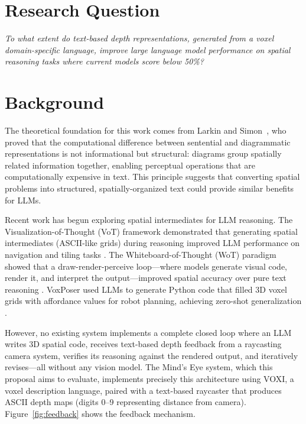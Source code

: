 \documentclass[stu,12pt,a4paper,floatsintext]{apa7}
\begin{document}
\section*{Research Question}

\begin{center}
\emph{To what extent do text-based depth representations, generated from a voxel domain-specific language, improve large language model performance on spatial reasoning tasks where current models score below 50\%?}
\end{center}

\section*{Background}

The theoretical foundation for this work comes from Larkin and Simon~\cite{larkin1987}, who proved that the computational difference between sentential and diagrammatic representations is not informational but structural: diagrams group spatially related information together, enabling perceptual operations that are computationally expensive in text. This principle suggests that converting spatial problems into structured, spatially-organized text could provide similar benefits for LLMs.

Recent work has begun exploring spatial intermediates for LLM reasoning. The Visualization-of-Thought (VoT) framework demonstrated that generating spatial intermediates (ASCII-like grids) during reasoning improved LLM performance on navigation and tiling tasks \cite{wu2024}. The Whiteboard-of-Thought (WoT) paradigm showed that a draw-render-perceive loop---where models generate visual code, render it, and interpret the output---improved spatial accuracy over pure text reasoning \cite{menon2024}. VoxPoser used LLMs to generate Python code that filled 3D voxel grids with affordance values for robot planning, achieving zero-shot generalization \cite{huang2023}.

However, no existing system implements a complete closed loop where an LLM writes 3D spatial code, receives text-based depth feedback from a raycasting camera system, verifies its reasoning against the rendered output, and iteratively revises---all without any vision model. The Mind's Eye system, which this proposal aims to evaluate, implements precisely this architecture using VOXI, a voxel description language, paired with a text-based raycaster that produces ASCII depth maps (digits 0--9 representing distance from camera). Figure~\ref{fig:feedback} shows the feedback mechanism.
\end{document}
